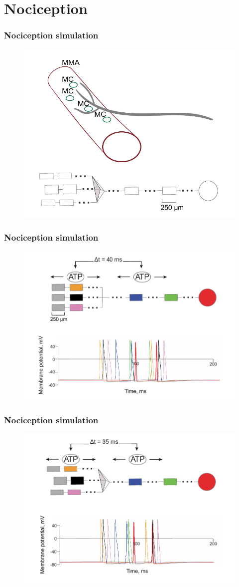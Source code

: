 \documentclass[12pt, aspectratio=169]{beamer}
\begin{document}
\section{Nociception}
\begin{frame}
  \frametitle{Nociception simulation}
  \begin{figure}
    \includegraphics[width=0.7\linewidth]{1.pdf}
  \end{figure}
\end{frame}
\begin{frame}
  \frametitle{Nociception simulation}
  \begin{figure}
    \includegraphics[width=0.7\linewidth]{2_1.pdf}
  \end{figure}
\end{frame}
\begin{frame}
  \frametitle{Nociception simulation}
  \begin{figure}
    \includegraphics[width=0.7\linewidth]{2_2.pdf}
  \end{figure}
\end{frame}
\end{document}
